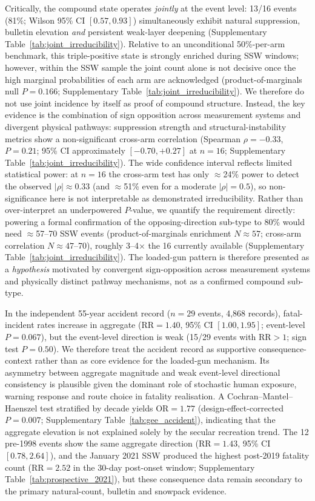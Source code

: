 \documentclass[11pt,letterpaper]{article}
\begin{document}
Critically, the compound state operates \emph{jointly} at the event level: 13/16 events (81\%; Wilson 95\% CI $[0.57, 0.93]$) simultaneously exhibit natural suppression, bulletin elevation \emph{and} persistent weak-layer deepening (Supplementary Table~\ref{tab:joint_irreducibility}). Relative to an unconditional 50\%-per-arm benchmark, this triple-positive state is strongly enriched during SSW windows; however, within the SSW sample the joint count alone is not decisive once the high marginal probabilities of each arm are acknowledged (product-of-marginals null $P = 0.166$; Supplementary Table~\ref{tab:joint_irreducibility}). We therefore do not use joint incidence by itself as proof of compound structure. Instead, the key evidence is the combination of sign opposition across measurement systems and divergent physical pathways: suppression strength and structural-instability metrics show a non-significant cross-arm correlation (Spearman $\rho = -0.33$, $P = 0.21$; 95\% CI approximately $[-0.70, +0.27]$ at $n = 16$; Supplementary Table~\ref{tab:joint_irreducibility}). The wide confidence interval reflects limited statistical power: at $n = 16$ the cross-arm test has only $\approx$24\% power to detect the observed $|\rho| \approx 0.33$ (and $\approx$51\% even for a moderate $|\rho| = 0.5$), so non-significance here is not interpretable as demonstrated irreducibility. Rather than over-interpret an underpowered $P$-value, we quantify the requirement directly: powering a formal confirmation of the opposing-direction sub-type to 80\% would need $\approx$57--70 SSW events (product-of-marginals enrichment $N \approx 57$; cross-arm correlation $N \approx 47$--70), roughly 3--4$\times$ the 16 currently available (Supplementary Table~\ref{tab:joint_irreducibility}). The loaded-gun pattern is therefore presented as a \emph{hypothesis} motivated by convergent sign-opposition across measurement systems and physically distinct pathway mechanisms, not as a confirmed compound sub-type.

In the independent 55-year accident record ($n = 29$ events, 4,868 records), fatal-incident rates increase in aggregate ($\mathrm{RR} = 1.40$, 95\% CI $[1.00, 1.95]$; event-level $P = 0.067$), but the event-level direction is weak (15/29 events with $\mathrm{RR} > 1$; sign test $P = 0.50$). We therefore treat the accident record as supportive consequence-context rather than as core evidence for the loaded-gun mechanism. Its asymmetry between aggregate magnitude and weak event-level directional consistency is plausible given the dominant role of stochastic human exposure, warning response and route choice in fatality realisation\cite{Techel2016}. A Cochran--Mantel--Haenszel test stratified by decade yields $\mathrm{OR} = 1.77$ (design-effect-corrected $P = 0.007$; Supplementary Table~\ref{tab:gee_accident}), indicating that the aggregate elevation is not explained solely by the secular recreation trend. The 12 pre-1998 events show the same aggregate direction ($\mathrm{RR} = 1.43$, 95\% CI $[0.78, 2.64]$), and the January 2021 SSW produced the highest post-2019 fatality count ($\mathrm{RR} = 2.52$ in the 30-day post-onset window; Supplementary Table~\ref{tab:prospective_2021}), but these consequence data remain secondary to the primary natural-count, bulletin and snowpack evidence.
\end{document}
